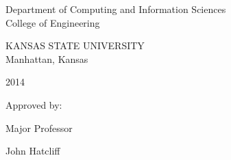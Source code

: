 \begin{center}
   \begin{singlespace}
   Department of Computing and Information Sciences\\
   College of Engineering\\
   \end{singlespace}

   \vspace{0.3cm}

   \begin{singlespace}
   {\large KANSAS STATE UNIVERSITY}\\
   Manhattan, Kansas\\
   \end{singlespace}


   2014\\
   \vspace{0.3cm}

    \end{center}

    \begin{flushright}
    Approved by:\\
    \vspace{0.3cm}
    \begin{singlespace}
    Major Professor



    John Hatcliff\\
    \end{singlespace}
    \end{flushright}


